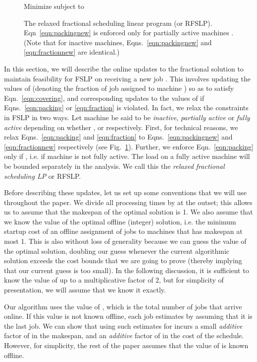 \documentclass[11pt]{article}
\begin{document}
\begin{figure}[!htb]
	\small
	\centering
	Minimize  subject to
	
	\caption{\small The relaxed fractional scheduling linear program (or RFSLP). 
		Eqn~\ref{eqn:packingnew} is enforced only for partially active machines .
		(Note that for inactive machines, Eqns.~\ref{eqn:packingnew} and
		\ref{eqn:fractionnew} are identical.)}
	\label{fig:lp-relaxed}
\end{figure}

In this section, we will describe the online updates to the fractional
solution to maintain feasibility for FSLP on receiving a new job . 
This involves updating the values of 
 (denoting the fraction of job  assigned to machine )
so as to satisfy Eqn.~\ref{eqn:covering}, and corresponding updates 
to the values of  if Eqns.~\ref{eqn:packing} or \ref{eqn:fraction}
is violated. 
In fact, we relax the constraints in FSLP in two ways.
Let machine  be said to be {\em inactive}, {\em partially active} or
{\em fully active} depending on whether ,  or
 respectively. First, for technical reasons, 
we relax Eqns.~\ref{eqn:packing} and \ref{eqn:fraction} 
to Eqns.~\ref{eqn:packingnew} and \ref{eqn:fractionnew} respectively
(see Fig.~\ref{fig:lp-relaxed}). Further, we 
enforce Eqn.~\ref{eqn:packing} only if , i.e. if machine 
 is not fully active. The load on a fully active machine will
be bounded separately in the analysis.
We call this the {\em relaxed fractional scheduling LP} or RFSLP.

Before describing these updates, let us set up some 
conventions that we will use throughout the paper.
We divide all processing times by  at the outset;
this allows us to assume that the makespan of the optimal solution is 1.
We also assume that we know the value  of the optimal 
offline (integer) solution, i.e. the minimum startup cost of an offline 
assignment of jobs to machines that has makespan at most 1. 
This is also without loss of generality because we can guess the 
value of the optimal solution, doubling our guess whenever the 
current algorithmic solution exceeds the cost bounds that we are 
going to prove (thereby implying that our current guess is too small). 
In the following discussion, it is sufficient to
know the value of  up to a multiplicative 
factor of 2, but for simplicity
of presentation, we will assume that we know it exactly.

Our algorithm uses the value of , which is the total number of
jobs that arrive online. If this value is not known offline, each job 
estimates  by assuming that it is the last job. We can show that 
using such estimates for  incurs a small {\em additive} factor of 
 in the makespan, and an {\em additive} factor of 
 in the cost of the schedule. 
However, for simplicity, the rest of the paper assumes that the value 
of  is known offline.
\end{document}
